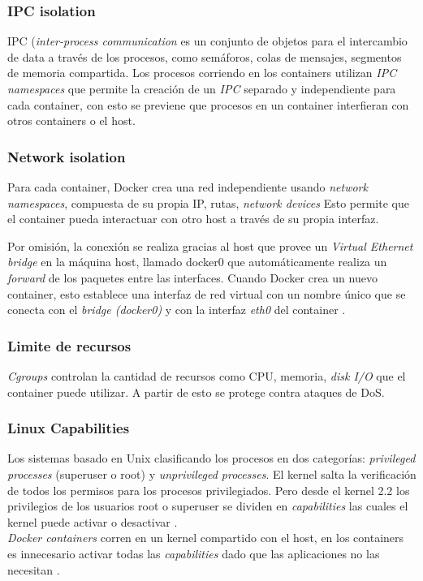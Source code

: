 	\subsubsection{IPC isolation}
	IPC (\emph{inter-process communication} es un conjunto de objetos para el intercambio de data a través de los procesos, como semáforos, colas de mensajes, segmentos de memoria compartida. Los procesos corriendo en los containers utilizan \emph{IPC namespaces} que permite la creación de un \emph{IPC} separado y independiente para cada container, con esto se previene que procesos en un container interfieran con otros containers o el host.
	
		
	\subsubsection{Network isolation}
	Para cada container, Docker crea una red independiente usando \emph{network namespaces}, compuesta de su propia IP, rutas, \emph{network devices} Esto permite que el container pueda interactuar con otro host a través de su propia interfaz.

	Por omisión, la conexión se realiza gracias al host que provee un \emph{Virtual Ethernet bridge} en la máquina host, llamado docker0 que automáticamente realiza un \emph{forward} de los paquetes entre las interfaces. Cuando Docker crea un nuevo container, esto establece una interfaz de red virtual con un nombre único que se conecta con el \emph{bridge (docker0)} y con la interfaz \emph{eth0} del container \cite{bui2015analysis}.
	
	\subsubsection{Limite de recursos}
	
	\emph{Cgroups} controlan la cantidad de recursos como CPU, memoria, \emph{disk I/O} que el container puede utilizar. A partir de esto se protege contra ataques de DoS.
	
	\subsubsection{Linux Capabilities}
	
	Los sistemas basado en Unix clasificando los procesos en dos categorías: \textit{privileged processes} (superuser o root) y  \textit{unprivileged processes}. El kernel salta la verificación de todos los permisos para los procesos privilegiados. Pero desde el kernel 2.2 los privilegios de los usuarios root o superuser se dividen en \textit{capabilities} las cuales el kernel puede activar o desactivar \cite{walsh:2014:Online}.\\
	\textit{Docker containers} corren en un kernel compartido con el host, en los containers es innecesario activar todas las \textit{capabilities} dado que las aplicaciones no las necesitan \cite{Docker:2015:Security}.



